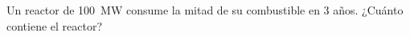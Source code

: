 \documentclass[./../main.tex]{subfiles}
\begin{document}
    \begin{exercise}
        Un reactor de \qty{100}{\MW} consume la mitad de su combustible en 3 años. ¿Cuánto  contiene el reactor?
    \end{exercise}
\end{document}
